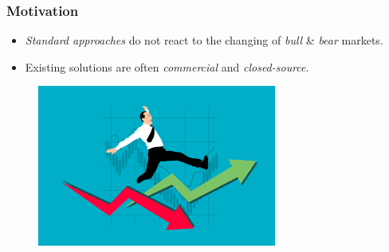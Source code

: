 





\begin{frame}
  \frametitle{Motivation}

  \centering

  \begin{itemize}
    \item \emph{Standard approaches} do not react to the changing of \emph{bull} \& \emph{bear} markets.
    \item Existing solutions are often \emph{commercial} and \emph{closed-source}.
  \end{itemize}

  \smallskip

  \begin{figure}
      \includegraphics[width=0.7\textwidth]{img/risk.png}
  \end{figure}
\end{frame}


